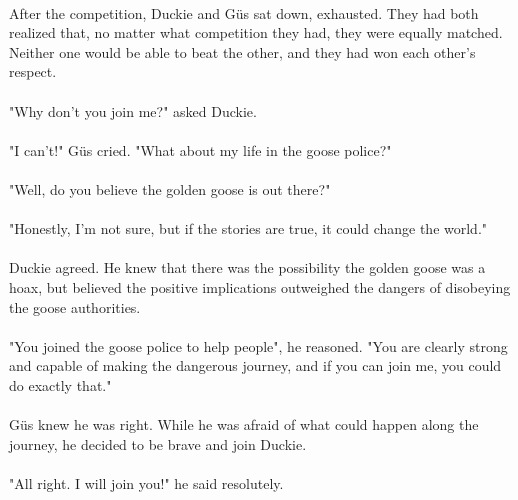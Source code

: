 \paragraph{} After the competition, Duckie and Güs sat down, exhausted. They had both realized that, no matter what competition they had, they were equally matched. Neither one would be able to beat the other, and they had won each other's respect. 
\paragraph{} "Why don't you join me?" asked Duckie.
\paragraph{} "I can't!" Güs cried. "What about my life in the goose police?"
\paragraph{} "Well, do you believe the golden goose is out there?"
\paragraph{} "Honestly, I'm not sure, but if the stories are true, it could change the world."
\paragraph{} Duckie agreed. He knew that there was the possibility the golden goose was a hoax, but believed the positive implications outweighed the dangers of disobeying the goose authorities. 
\paragraph{} "You joined the goose police to help people", he reasoned. "You are clearly strong and capable of making the dangerous journey, and if you can join me, you could do exactly that."
\paragraph{} Güs knew he was right. While he was afraid of what could happen along the journey, he decided to be brave and join Duckie. 
\paragraph{} "All right. I will join you!" he said resolutely. 